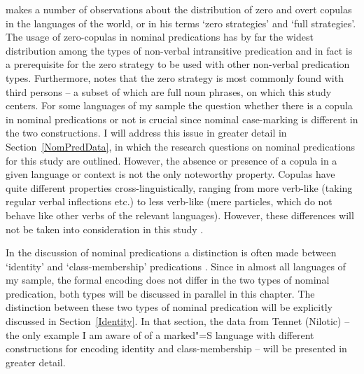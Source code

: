 \citet[62--100]{Stassen:1997} makes a number of observations about the distribution of zero and overt copulas in the languages of the world, or in his terms `zero strategies' and `full strategies'. 
The usage of zero-copulas in nominal predications has by far the widest distribution among the types of non-verbal intransitive predication and in fact is a prerequisite for the zero strategy to be used with other non-verbal predication types. 
Furthermore, \citet[65]{Stassen:1997} notes that the zero strategy is most commonly found with third persons -- a subset of which are full noun phrases, on which this study centers. 
For some languages of my sample the question whether there is a copula in nominal predications or not is crucial since nominal case-marking is different in the two constructions. 
I will address this issue in greater detail in Section~\ref{NomPredData}, in which the research questions on nominal predications for this study are outlined. 
However, the absence or presence of a copula in a given language or context is not the only noteworthy property.
Copulas have quite different properties cross-linguistically, ranging from more verb-like (taking regular verbal inflections etc.) to less verb-like (mere particles, which do not behave like other verbs of the relevant languages). 
However, these differences will not be taken into consideration in this study \citep[for a detailed study of the category copula across languages, see][]{Pustet:2003}. 
 
In the discussion of nominal predications a distinction is often made between `identity' and `class-membership' predications \citep[100]{Stassen:1997}. 
Since in almost all languages of my sample, the formal encoding does not differ in the two types of nominal predication, both types will be discussed in parallel in this chapter. 
The distinction between these two types of nominal predication will be explicitly discussed in Section~\ref{Identity}.
In that section, the data from Tennet (Nilotic) -- the only example I am aware of of a marked"=S language with different constructions for encoding identity and class-membership -- will be presented in greater detail.  

